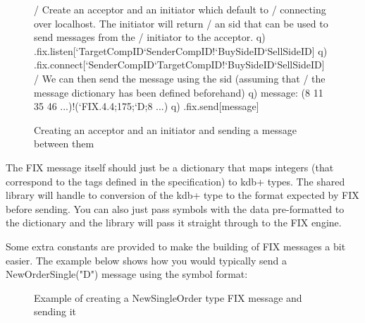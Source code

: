 \begin{figure}[H]
\begin{qcode}
/ Create an acceptor and an initiator which default to 
/ connecting over localhost. The initiator will return
/ an sid that can be used to send messages from the
/ initiator to the acceptor.
q) .fix.listen[`TargetCompID`SenderCompID!`BuySideID`SellSideID]
q) .fix.connect[`SenderCompID`TargetCompID!`BuySideID`SellSideID]
/ We can then send the message using the sid (assuming that
/ the message dictionary has been defined beforehand)
q) message: (8 11 35 46 ...)!(`FIX.4.4;175;`D;8 ...)
q) .fix.send[message]
\end{qcode}
\caption{Creating an acceptor and an initiator and sending a message between them}
\end{figure}

The FIX message itself should just be a dictionary that maps integers (that correspond to the tags defined in the specification) to kdb+ types. The shared library will handle to conversion of the kdb+ type to the format expected by FIX before sending. You can also just pass symbols with the data pre-formatted to the dictionary and the library will pass it straight through to the FIX engine.

Some extra constants are provided to make the building of FIX messages a bit easier. The example below shows how you would typically send a NewOrderSingle("D") message using the symbol format:

\begin{figure}[H]
\caption{Example of creating a NewSingleOrder type FIX message and sending it}
\end{figure}

